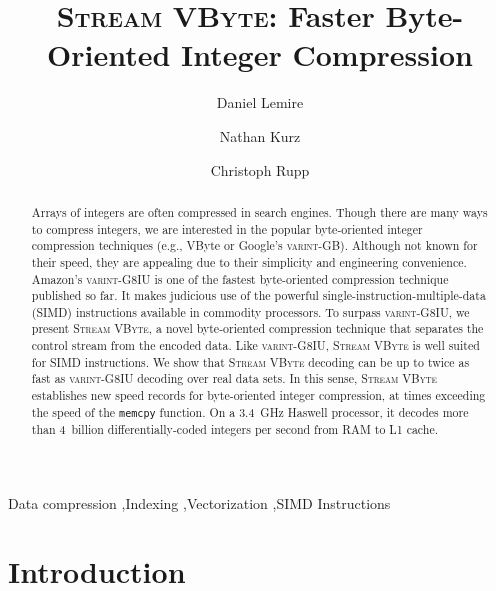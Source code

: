 \documentclass[compress]{elsarticle}
\author[UQAM]{Daniel Lemire\corref{cor1}} \ead{lemire@gmail.com}
\author[verse]{Nathan Kurz} \ead{natekurz@gmail.com}
\author[Upscaledb]{Christoph Rupp} \ead{chris@crupp.de}
\newcommand{\vbyte}{VByte}
\newcommand{\varintgb}{\textsc{varint-GB}}
\newcommand{\streamvbyte}{\textsc{Stream \vbyte{}}}
\newcommand{\varintgiu}{\textsc{varint-G8IU}}
\newcommand{\ourtitle}{\streamvbyte{}: Faster Byte-Oriented Integer Compression}
\begin{document}
\title{\ourtitle{}}

\begin{frontmatter}

\begin{abstract}
Arrays of integers are often compressed
in search engines. Though there are many ways to compress
integers, we are interested in the popular byte-oriented integer compression
techniques (e.g., \vbyte{} or Google's \varintgb{}). Although not known for their speed, they are appealing due to their simplicity and engineering convenience.
Amazon's \varintgiu{} is one of the fastest
byte-oriented compression technique published so far.
It makes judicious use of the powerful single-instruction-multiple-data (SIMD) instructions
available in commodity processors. To surpass \varintgiu{},
we present \streamvbyte{}, a novel byte-oriented compression
technique that separates the control stream from the encoded data. Like \varintgiu{}, \streamvbyte{} is well suited for SIMD instructions.
 We show that \streamvbyte{} decoding can be up to twice as fast as  \varintgiu{} decoding over real data sets. In this sense,
\streamvbyte{} establishes new speed records for byte-oriented integer compression, at times exceeding the speed of the \texttt{memcpy} function. On a \SI{3.4}{GHz}  Haswell processor, it decodes more than 4~billion  differentially-coded integers per second from RAM to L1 cache.


\end{abstract}

\begin{keyword}
Data compression \sep Indexing \sep Vectorization \sep SIMD Instructions
\end{keyword}

\end{frontmatter}






\section{Introduction}
\end{document}
